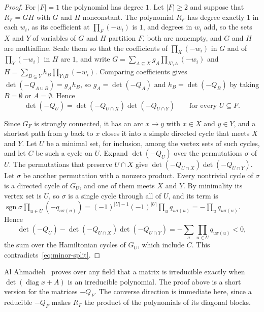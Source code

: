\begin{proof}
For $|F|=1$ the polynomial has degree $1$. Let $|F|\ge2$ and suppose that
$R_F=GH$ with $G$ and $H$ nonconstant. The polynomial $R_F$ has degree exactly
$1$ in each $w_i$, as its coefficient at $\prod_F(-w_i)$ is $1$, and degrees in $w_i$ add, so the sets $X$ and $Y$ of
variables of $G$ and $H$ partition $F$, both are nonempty, and $G$ and $H$ are
multiaffine. Scale them so that the coefficients of $\prod_X(-w_i)$ in $G$ and of
$\prod_Y(-w_i)$ in $H$ are $1$, and write
$G=\sum_{A\subseteq X}g_A\prod_{X\setminus A}(-w_i)$ and
$H=\sum_{B\subseteq Y}h_B\prod_{Y\setminus B}(-w_i)$. Comparing coefficients
gives $\det(-Q_{A\cup B})=g_Ah_B$, so $g_A=\det(-Q_A)$ and $h_B=\det(-Q_B)$ by
taking $B=\emptyset$ or $A=\emptyset$. Hence
\begin{equation}\label{eq:minor-split}
 \det(-Q_U)=\det(-Q_{U\cap X})\det(-Q_{U\cap Y})\qquad\text{for every }U\subseteq F.
\end{equation}

Since $G_F$ is strongly connected, it has an arc $x\to y$ with $x\in X$ and $y\in
Y$, and a shortest path from $y$ back to $x$ closes it into a simple directed
cycle that meets $X$ and $Y$. Let $U$ be a minimal set, for inclusion, among the
vertex sets of such cycles, and let $C$ be such a cycle on $U$. Expand $\det(-Q_U)$
over the permutations $\sigma$ of $U$. The permutations that preserve $U\cap X$
give $\det(-Q_{U\cap X})\det(-Q_{U\cap Y})$. Let $\sigma$ be another permutation with
a nonzero product. Every nontrivial cycle of $\sigma$ is a directed cycle of
$G_U$, and one of them meets $X$ and $Y$. By minimality its vertex set is $U$,
so $\sigma$ is a single cycle through all of $U$, and its term is
$\operatorname{sgn}\sigma\prod_{u\in U}(-q_{u\sigma(u)})=(-1)^{|U|-1}(-1)^{|U|}\prod_uq_{u\sigma(u)}
=-\prod_uq_{u\sigma(u)}$. Hence
\[
 \det(-Q_U)-\det(-Q_{U\cap X})\det(-Q_{U\cap Y})=-\sum_\sigma\prod_{u\in U}q_{u\sigma(u)}<0,
\]
the sum over the Hamiltonian cycles of $G_U$, which include $C$. This
contradicts~\eqref{eq:minor-split}.
\end{proof}

Al Ahmadieh~\cite[Lemma~5.1 and Corollary~5.6]{alahmadieh2023} proves over any
field that a matrix is irreducible exactly when $\det(\operatorname{diag}x+A)$
is an irreducible polynomial. The proof above is a short version for the
matrices $-Q_F$. The converse direction is immediate here, since a reducible
$-Q_F$ makes $R_F$ the product of the polynomials of its diagonal blocks.


